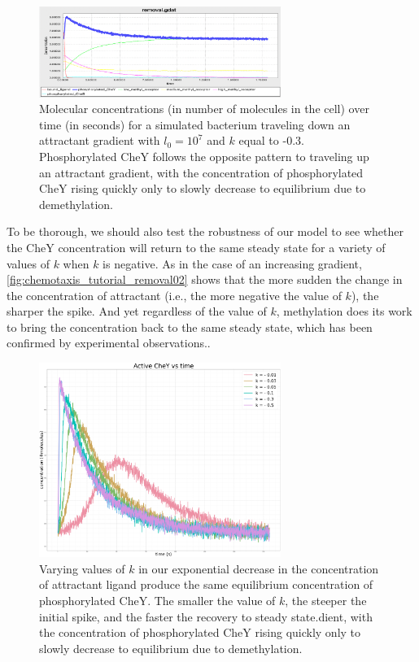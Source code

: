 \begin{figure}[h]
\centering
\mySfFamily
\includegraphics[width = 0.7\textwidth]{../images/chemotaxis_tutorial_removal01.png}
\caption{Molecular concentrations (in number of molecules in the cell) over time (in seconds) for a simulated bacterium traveling down an attractant gradient with $l_0 = 10^7$ and $k$ equal to -0.3. Phosphorylated CheY follows the opposite pattern to traveling up an attractant gradient, with the concentration of phosphorylated CheY rising quickly only to slowly decrease to equilibrium due to demethylation.}
\label{fig:chemotaxis_tutorial_removal01}
\end{figure}


To be thorough, we should also test the robustness of our model to see whether the CheY concentration will return to the same steady state for a variety of values of $k$ when $k$ is negative. As in the case of an increasing gradient, \autoref{fig:chemotaxis_tutorial_removal02} shows that the more sudden the change in the concentration of attractant (i.e., the more negative the value of $k$), the sharper the spike. And yet regardless of the value of $k$, methylation does its work to bring the concentration back to the same steady state, which has been confirmed by experimental observations.\citep{Krembel_2015}.

\begin{figure}[h]
\centering
\mySfFamily
\includegraphics[width = 0.7\textwidth]{../images/chemotaxis_tutorial_removal02.png}
\caption{Varying values of $k$ in our exponential decrease in the concentration of attractant ligand produce the same equilibrium concentration of phosphorylated CheY. The smaller the value of $k$, the steeper the initial spike, and the faster the recovery to steady state.dient, with the concentration of phosphorylated CheY rising quickly only to slowly decrease to equilibrium due to demethylation.}
\label{fig:chemotaxis_tutorial_removal02}
\end{figure}

